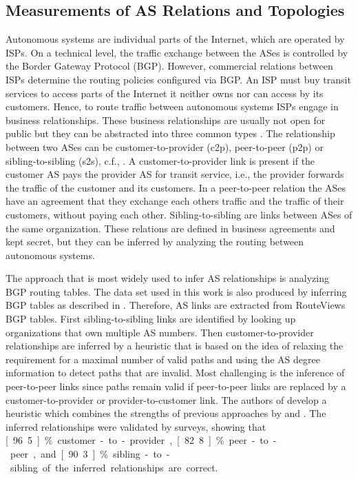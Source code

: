 \subsection{Measurements of AS Relations and Topologies}

Autonomous systems are individual parts of the Internet, which are operated by ISPs.
On a technical level, the traffic exchange between the ASes is controlled by the Border Gateway Protocol (BGP)\cite{trangia2009}. However, commercial relations between ISPs determine the routing policies configured via BGP.
An ISP must buy transit services to access parts of the Internet it neither owns nor can access by its customers.
Hence, to route traffic between autonomous systems ISPs engage in business relationships.
These business relationships are usually not open for public but they can be abstracted into three common types \cite{gao2001}.
The relationship between two ASes can be customer-to-provider (c2p), peer-to-peer (p2p) or sibling-to-sibling (s2s), c.f., .
A customer-to-provider link is present if the customer AS pays the provider AS for transit service, i.e., the provider forwards the traffic of the customer and its customers. In a peer-to-peer relation the ASes have an agreement that they exchange each others traffic and the traffic of their customers, without paying each other. Sibling-to-sibling are links between ASes of the same organization. These relations are defined in business agreements and kept secret, but they can be inferred by analyzing the routing between autonomous systems.

The approach that is most widely used to infer AS relationships is analyzing BGP routing tables. The data set used in this work is also produced by inferring BGP tables as described in \cite{dimitropoulos2007relationships}. Therefore, AS links are extracted from RouteViews BGP tables. First sibling-to-sibling links are identified by looking up organizations that own multiple AS numbers. Then customer-to-provider relationships are inferred by a heuristic that is based on the idea of relaxing the requirement for a maximal number of valid paths and using the AS degree information to detect paths that are invalid. Most challenging is the inference of peer-to-peer links since paths remain valid if peer-to-peer links are replaced by a customer-to-provider or provider-to-customer link. The authors of \cite{dimitropoulos2007relationships} develop a heuristic which combines the strengths of previous approaches by \cite{gao2001} and \cite{di2003computing}. The inferred relationships were validated by surveys, showing that \unit[96.5]{\%} customer-to-provider, \unit[82.8]{\%} peer-to-peer, and \unit[90.3]{\%} sibling-to-sibling of the inferred relationships are correct.

